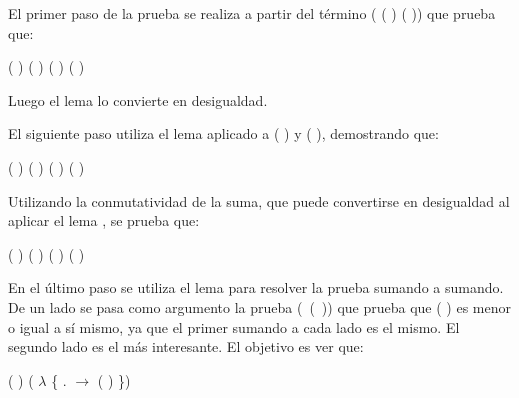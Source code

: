 \begin{AgdaAlign}
El primer paso de la prueba se realiza a partir del término ( ( )   ( )) que prueba que:
\begin{center}
\AgdaFunction{[}  \AgdaFunction{]}  ( ) (  \AgdaFunction{+} ) \AgdaFunction{$\sim$}  ( ) ( ) 
\end{center}
Luego el lema \AgdaFunction{$\sim\rightarrow\leq$} lo convierte en desigualdad. 

El siguiente paso utiliza el lema  aplicado a ( ) y ( ), demostrando que:
\begin{center}
\AgdaFunction{[}  \AgdaFunction{]}  ( ) ( ) \AgdaFunction{$\leq$}  ( ) \AgdaFunction{+} ( )
\end{center}

Utilizando la conmutatividad de la suma, que puede convertirse en desigualdad al aplicar el lema \AgdaFunction{$\sim\rightarrow\leq$}, se prueba que:
\begin{center}
\AgdaFunction{[}  \AgdaFunction{]}  ( ) \AgdaFunction{+} ( ) \AgdaFunction{$\leq$}  ( ) \AgdaFunction{+} ( )
\end{center}

En el último paso se utiliza el lema  para resolver la prueba sumando a sumando. De un lado se pasa como argumento la prueba \hbox{( ( ))} que prueba que ( ) es menor o igual a sí mismo, ya que el primer sumando a cada lado es el mismo. El segundo lado es el más interesante. El objetivo es ver que: 
\begin{center}
\AgdaFunction{[}  \AgdaFunction{]}  ( ) \AgdaFunction{$\leq$} ( $\lambda$ \{ . $\rightarrow$  ( )  \})
\end{center}


\end{AgdaAlign}
